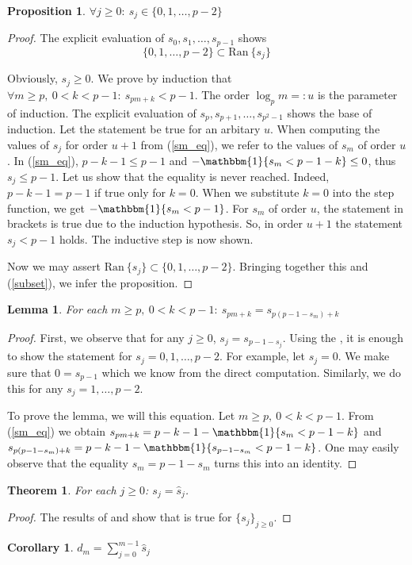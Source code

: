 \documentclass[a4paper]{article}
\theoremstyle{plain}
\newtheorem{theorem}{Theorem}[section]
\newtheorem{lemma}{Lemma}[section]
\newtheorem{proposition}{Proposition}[section]
\newtheorem{corollary}{Corollary}[section]
\theoremstyle{definition}
\begin{document}
\begin{proposition} \label{sm_estimate}
$\forall j \ge 0:\ s_j \in \{0, 1, \ldots, p-2\}$
\end{proposition}
\begin{proof}
The explicit evaluation of $s_0, s_1, \ldots, s_{p-1}$ shows 
\begin{equation}\label{subset}
\{0,1,\ldots,p-2\} \subset \mathrm{Ran\ } \{s_j\}
\end{equation}

Obviously, $s_j \ge 0$.
We prove by induction that $\forall m \ge p,\ 0 < k < p-1:\ s_{pm+k} < p-1$. The order $\log_p m =: u $ is the parameter of induction. The explicit evaluation of $s_p, s_{p+1}, \ldots, s_{p^2-1}$ shows the base of induction. Let the statement be true for an arbitary $u$. When computing the values of $s_j$ for order $u+1$ from (\ref{sm_eq}), we refer to the values of $s_m$ of order $u$. In (\ref{sm_eq}), $p-k-1 \le p-1$ and $- \mathbbm{1}\{s_m < p-1-k\} \le 0$, thus $s_j \le p-1$. Let us show that the equality is never reached. Indeed, $p-k-1 = p-1$ if true only for $k=0$. When we substitute $k=0$ into the step function, we get $- \mathbbm{1}\{s_m < p-1\}$. For $s_m$ of order $u$, the statement in brackets is true due to the induction hypothesis. So, in order $u+1$ the statement $s_j < p-1$ holds. The inductive step is now shown.

Now we may assert $\mathrm{Ran}\ \{s_j\} \subset \{0,1,\ldots,p-2\}$. Bringing together this and (\ref{subset}), we infer the proposition.
\end{proof}
\begin{lemma} \label{sm2}
For each $m \ge p,\ 0 < k < p-1:\ s_{pm+k}=s_{p(p-1-s_m)+k}$
\end{lemma}
\begin{proof}
First, we observe that for any $j \ge 0$, $s_j = s_{p-1 - s_j}$. Using the , it is enough to show the statement for $s_j=0,1,\ldots,p-2$. For example, let $s_j=0$. We make sure that $0 = s_{p-1}$ which we know from the direct computation. Similarly, we do this for any $s_j=1,\ldots,p-2$.

To prove the lemma, we will this equation. Let $m \ge p,\ 0 < k < p-1$. From (\ref{sm_eq}) we obtain $s_{pm+k}=p-k-1 - \mathbbm{1}\{s_m < p-1-k\}$ and $s_{p(p-1-s_m)+k}= p-k-1 - \mathbbm{1}\{s_{p-1-s_m} < p-1-k\}$. One may easily observe that the equality $s_m=p-1-s_m$ turns this into an identity.
\end{proof}
\begin{theorem}
For each $j \ge 0$: $s_j=\hat{s}_j$.
\end{theorem}
\begin{proof}
The results of  and  show that  is true for $\{s_j\}_{j \ge 0}$.
\end{proof}
\begin{corollary}
$d_m = \sum\limits_{j=0}^{m-1} \hat{s}_j$
\end{corollary}
\newpage

\end{document}

